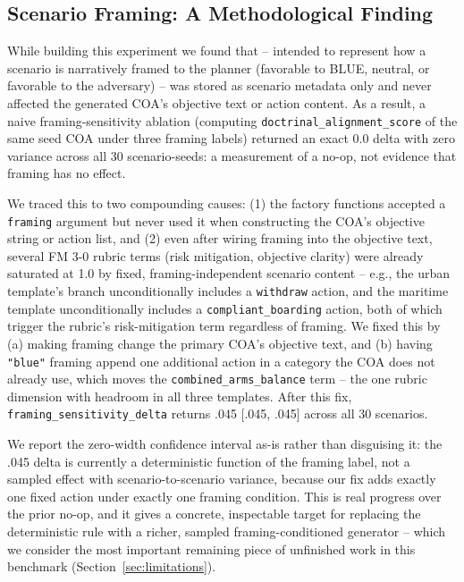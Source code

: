 \documentclass[sigconf]{acmart}
\begin{document}
\subsection{Scenario Framing: A Methodological Finding}

While building this experiment we found that  -- intended to represent how a scenario is narratively framed to the planner (favorable to BLUE, neutral, or favorable to the adversary) -- was stored as scenario metadata only and never affected the generated COA's objective text or action content. As a result, a naive framing-sensitivity ablation (computing \texttt{doctrinal\_alignment\_score} of the same seed COA under three framing labels) returned an exact 0.0 delta with zero variance across all 30 scenario-seeds: a measurement of a no-op, not evidence that framing has no effect.

We traced this to two compounding causes: (1) the factory functions accepted a \texttt{framing} argument but never used it when constructing the COA's objective string or action list, and (2) even after wiring framing into the objective text, several FM 3-0 rubric terms (risk mitigation, objective clarity) were already saturated at 1.0 by fixed, framing-independent scenario content -- e.g., the urban template's branch unconditionally includes a \texttt{withdraw} action, and the maritime template unconditionally includes a \texttt{compliant\_boarding} action, both of which trigger the rubric's risk-mitigation term regardless of framing. We fixed this by (a) making framing change the primary COA's objective text, and (b) having \texttt{"blue"} framing append one additional action in a category the COA does not already use, which moves the \texttt{combined\_arms\_balance} term -- the one rubric dimension with headroom in all three templates. After this fix, \texttt{framing\_sensitivity\_delta} returns .045 [.045, .045] across all 30 scenarios.

We report the zero-width confidence interval as-is rather than disguising it: the .045 delta is currently a deterministic function of the framing label, not a sampled effect with scenario-to-scenario variance, because our fix adds exactly one fixed action under exactly one framing condition. This is real progress over the prior no-op, and it gives a concrete, inspectable target for replacing the deterministic rule with a richer, sampled framing-conditioned generator -- which we consider the most important remaining piece of unfinished work in this benchmark (Section~\ref{sec:limitations}).
\end{document}
